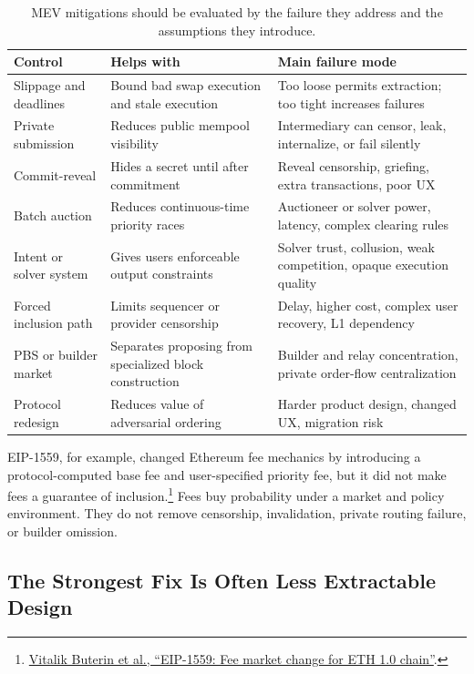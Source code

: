 \begin{table}[htbp]
\centering
\small
\renewcommand{\arraystretch}{1.16}
\begin{tabularx}{\textwidth}{@{}>{\RaggedRight\arraybackslash}p{}>{\RaggedRight\arraybackslash}p{}X@{}}
\toprule
Control & Helps with & Main failure mode \\
\midrule
Slippage and deadlines & Bound bad swap execution and stale execution & Too loose permits extraction; too tight increases failures \\
Private submission & Reduces public mempool visibility & Intermediary can censor, leak, internalize, or fail silently \\
Commit-reveal & Hides a secret until after commitment & Reveal censorship, griefing, extra transactions, poor UX \\
Batch auction & Reduces continuous-time priority races & Auctioneer or solver power, latency, complex clearing rules \\
Intent or solver system & Gives users enforceable output constraints & Solver trust, collusion, weak competition, opaque execution quality \\
Forced inclusion path & Limits sequencer or provider censorship & Delay, higher cost, complex user recovery, L1 dependency \\
PBS or builder market & Separates proposing from specialized block construction & Builder and relay concentration, private order-flow centralization \\
Protocol redesign & Reduces value of adversarial ordering & Harder product design, changed UX, migration risk \\
\bottomrule
\end{tabularx}
\caption{MEV mitigations should be evaluated by the failure they address and the assumptions they introduce.}
\end{table}

EIP-1559, for example, changed Ethereum fee mechanics by introducing a protocol-computed base fee and user-specified priority fee, but it did not make fees a guarantee of inclusion.\footnote{\href{https://eips.ethereum.org/EIPS/eip-1559}{Vitalik Buterin et al., ``EIP-1559: Fee market change for ETH 1.0 chain''}.} Fees buy probability under a market and policy environment. They do not remove censorship, invalidation, private routing failure, or builder omission.

\subsection{The Strongest Fix Is Often Less Extractable Design}

